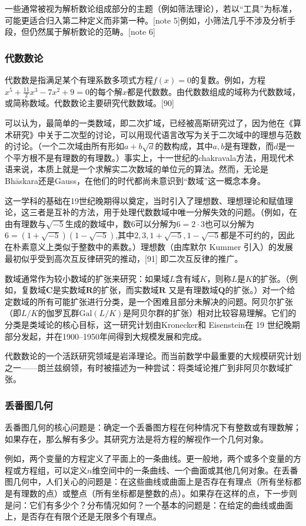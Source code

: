 一些通常被视为解析数论组成部分的主题（例如筛法理论），若以“工具”为标准，可能更适合归入第二种定义而非第一种。[note 5]例如，小筛法几乎不涉及分析手段，但仍然属于解析数论的范畴。[note 6]
\subsubsection{代数数论}
代数数是指满足某个有理系数多项式方程$f(x)=0$的复数。例如，方程$x^{5}+\tfrac{11}{2}x^{3}-7x^{2}+9=0$的每个解$x$都是代数数。由代数数组成的域称为代数数域，或简称数域。代数数论主要研究代数数域。[90]

可以认为，最简单的一类数域，即二次扩域，已经被高斯研究过了，因为他在《算术研究》中关于二次型的讨论，可以用现代语言改写为关于二次域中的理想与范数的讨论。（一个二次域由所有形如$a+b\sqrt{d}$的数构成，其中$a, b$是有理数，而$d$是一个平方根不是有理数的有理数。）事实上，十一世纪的chakravala方法，用现代术语来说，本质上就是一个求解实二次数域的单位元的算法。然而，无论是Bhāskara还是Gauss，在他们的时代都尚未意识到“数域”这一概念本身。

这一学科的基础在19世纪晚期得以奠定，当时引入了理想数、理想理论和赋值理论，这三者是互补的方法，用于处理代数数域中唯一分解失效的问题。（例如，在由有理数与$\sqrt{-5}$生成的数域中，数$6$可以分解为$6 = 2 \cdot 3$也可以分解为$6 = (1+\sqrt{-5})(1-\sqrt{-5})$,其中$2, 3, 1+\sqrt{-5}, 1-\sqrt{-5}$都是不可约的，因此在朴素意义上类似于整数中的素数。）理想数（由库默尔 Kummer 引入）的发展最初似乎受到高次互反律研究的推动，[91] 即二次互反律的推广。

数域通常作为较小数域的扩张来研究：如果域$L$含有域$K$，则称$L$是$K$的扩张。（例如，复数域$\mathbf{C}$是实数域$\mathbf{R}$的扩张，而实数域$\mathbf{R}$ 又是有理数域$\mathbf{Q}$的扩张。）对一个给定数域的所有可能扩张进行分类，是一个困难且部分未解决的问题。阿贝尔扩张（即$L/K$的伽罗瓦群$\mathrm{Gal}(L/K)$是阿贝尔群的扩张）相对比较容易理解。它们的分类是类域论的核心目标，这一研究计划由Kronecker和 Eisenstein在 19 世纪晚期部分发起，并在1900–1950年间得到大规模发展和完成。

代数数论的一个活跃研究领域是岩泽理论。而当前数学中最重要的大规模研究计划之一——朗兰兹纲领，有时被描述为一种尝试：将类域论推广到非阿贝尔数域扩张。
\subsubsection{丢番图几何}
丢番图几何的核心问题是：确定一个丢番图方程在何种情况下有整数或有理数解；如果存在，那么解有多少。其研究方法是将方程的解视作一个几何对象。

例如，两个变量的方程定义了平面上的一条曲线。更一般地，两个或多个变量的方程或方程组，可以定义$n$维空间中的一条曲线、一个曲面或其他几何对象。在丢番图几何中，人们关心的问题是：在这些曲线或曲面上是否存在有理点（所有坐标都是有理数的点）或整点（所有坐标都是整数的点）。如果存在这样的点，下一步则是问：它们有多少个？分布情况如何？一个基本的问题是：在给定的曲线或曲面上，是否存在有限个还是无限多个有理点。

